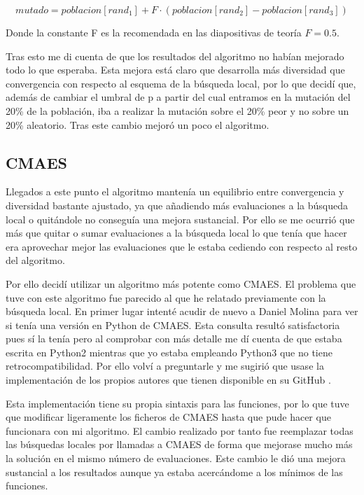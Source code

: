 \documentclass[12pt,a4paper]{article}
\begin{document}
    $$mutado = poblacion[rand_1] + F\cdot (poblacion[rand_2]-poblacion[rand_3])$$
    
    Donde la constante F es la recomendada en las diapositivas de teoría $F=0.5.$
    
    Tras esto me di cuenta de que los resultados del algoritmo no habían mejorado todo lo que esperaba. Esta mejora está claro que desarrolla más diversidad que convergencia con respecto al esquema de la búsqueda local, por lo que decidí que, además de cambiar el umbral de p a partir del cual entramos en la mutación del 20\% de la población, iba a realizar la mutación sobre el 20\% peor y no sobre un 20\% aleatorio. Tras este cambio mejoró un poco el algoritmo.
    
    \subsection{CMAES}
    
    Llegados a este punto el algoritmo mantenía un equilibrio entre convergencia y diversidad bastante ajustado, ya que añadiendo más evaluaciones a la búsqueda local o quitándole no conseguía una mejora sustancial. Por ello se me ocurrió que más que quitar o sumar evaluaciones a la búsqueda local lo que tenía que hacer era aprovechar mejor las evaluaciones que le estaba cediendo con respecto al resto del algoritmo.
    
    Por ello decidí utilizar un algoritmo más potente como CMAES. El problema que tuve con este algoritmo fue parecido al que he relatado previamente con la búsqueda local. En primer lugar intenté acudir de nuevo a Daniel Molina para ver si tenía una versión en Python de CMAES. Esta consulta resultó satisfactoria pues sí la tenía pero al comprobar con más detalle me dí cuenta de que estaba escrita en Python2 mientras que yo estaba empleando Python3 que no tiene retrocompatibilidad. Por ello volví a preguntarle y me sugirió que usase la implementación de los propios autores que tienen disponible en su GitHub \cite{PYCMA}.
    
    Esta implementación tiene su propia sintaxis para las funciones, por lo que tuve que modificar ligeramente los ficheros de CMAES hasta que pude hacer que funcionara con mi algoritmo. El cambio realizado por tanto fue reemplazar todas las búsquedas locales por llamadas a CMAES de forma que mejorase mucho más la solución en el mismo número de evaluaciones. Este cambio le dió una mejora sustancial a los resultados aunque ya estaba acercándome a los mínimos de las funciones.
    
\end{document}
